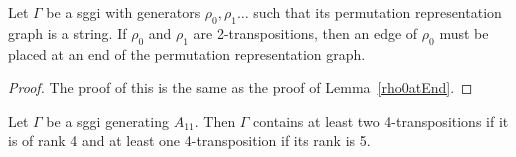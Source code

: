 \begin{lemma}
  \label{rho0atEnd2}
  Let $\Gamma$ be a sggi with generators $\rho_0, \rho_1 \dots$ such that its permutation representation graph is a string. If $\rho_0$ and $\rho_1$ are 2-transpositions, then an edge of $\rho_0$ must be placed at an end of the permutation representation graph.
\end{lemma}

\begin{proof}
  The proof of this is the same as the proof of Lemma~\ref{rho0atEnd}.
\end{proof}

\begin{lemma}
  \label{min-4-trans}
  Let $\Gamma$ be a sggi generating $A_{11}$. Then $\Gamma$ contains at least two 4-transpositions if it is of rank 4 and at least one 4-transposition if its rank is 5.
\end{lemma}

